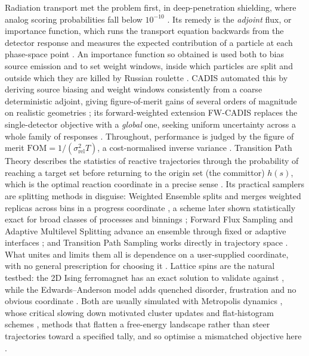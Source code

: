 \documentclass[11pt]{article}
\begin{document}
	Radiation transport met the problem first, in deep-penetration shielding, where analog
	scoring probabilities fall below $10^{-10}$ \cite{spanier1969, wagner1998}. Its remedy is
	the \emph{adjoint} flux, or importance function, which runs the transport equation
	backwards from the detector response and measures the expected contribution of a particle
	at each phase-space point \cite{lewins1965, bell1970}. An importance function so obtained
	is used both to bias source emission and to set weight windows, inside which particles are
	split and outside which they are killed by Russian roulette \cite{kahn1951, booth1984}.
	CADIS automated this by deriving source biasing and weight windows consistently from a
	coarse deterministic adjoint, giving figure-of-merit gains of several orders of magnitude
	on realistic geometries \cite{wagner1998, haghighat2003}; its forward-weighted extension
	FW-CADIS replaces the single-detector objective with a \emph{global} one, seeking uniform
	uncertainty across a whole family of responses \cite{wagnerfw2014, cooper2001}.
	Throughout, performance is judged by the figure of merit
	$\mathrm{FOM}=1/(\sigma_{\mathrm{rel}}^{2}T)$, a cost-normalised inverse variance
	\cite{spanier1969, wagnerfw2014}.
	Transition Path Theory describes the statistics of reactive trajectories through the probability of reaching a target set before returning to the origin set (the committor)	$h(s)$, which
	is the optimal reaction coordinate in a precise sense \cite{e2006, metzner2009,
		evanden2010}. Its practical samplers are splitting methods in disguise: Weighted Ensemble
	splits and merges weighted replicas across bins in a progress coordinate \cite{huber1996},
	a scheme later shown statistically exact for broad classes of processes and binnings
	\cite{zhang2010}; Forward Flux Sampling and Adaptive Multilevel Splitting advance an
	ensemble through fixed or adaptive interfaces \cite{allen2009, cerou2007}; and Transition
	Path Sampling works directly in trajectory space \cite{bolhuis2002}. What unites and
	limits them all is dependence on a user-supplied coordinate, with no general prescription
	for choosing it \cite{zuckerman2017, allen2009}. Lattice spins are the natural testbed:
	the 2D Ising ferromagnet \cite{ising1925} has an exact solution to validate against
	\cite{onsager1944}, while the Edwards--Anderson model adds quenched disorder, frustration
	and no obvious coordinate \cite{edwards1975, binder1986}. Both are usually simulated with
	Metropolis dynamics \cite{metropolis1953}, whose critical slowing down motivated cluster
	updates \cite{swendsen1987, wolff1989} and flat-histogram schemes \cite{berg1992,
		wanglandau2001}, methods that flatten a free-energy landscape rather than steer
	trajectories toward a specified tally, and so optimise a mismatched objective here
	\cite{wanglandau2001}.
	
\end{document}
